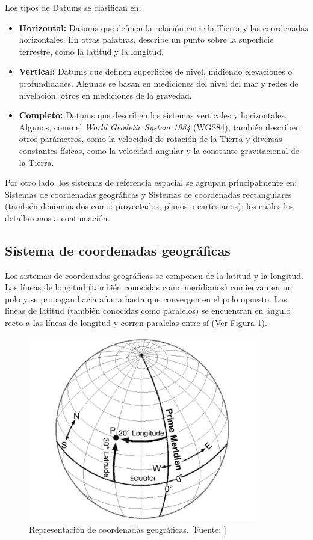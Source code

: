 Los tipos de Datums se clasifican en:
\begin{itemize}
    \item \textbf{Horizontal:} 
    Datums que definen la relación entre la Tierra y las coordenadas horizontales. En otras palabras, describe un punto sobre la superficie terrestre, como la latitud y la longitud.
    \item \textbf{Vertical:} 
    Datums que definen superficies de nivel, midiendo elevaciones o profundidades. Algunos se basan en mediciones del nivel del mar y redes de nivelación, otros en mediciones de la gravedad.
    \item \textbf{Completo:} 
    Datums que describen los sistemas verticales y horizontales. Algunos, como el \textit{World Geodetic System 1984} (WGS84), también describen otros parámetros, como la velocidad de rotación de la Tierra y diversas constantes físicas, como la velocidad angular y la constante gravitacional de la Tierra.
\end{itemize}

Por otro lado, los sistemas de referencia espacial se agrupan principalmente en: Sistemas de coordenadas geográficas y Sistemas de coordenadas rectangulares (también denominados como: proyectados, planos o cartesianos); los cuáles los detallaremos a continuación.

\subsection{Sistema de coordenadas geográficas}
Los sistemas de coordenadas geográficas se componen de la latitud y la longitud. Las líneas de longitud (también conocidas como meridianos) comienzan en un polo y se propagan hacia afuera hasta que convergen en el polo opuesto. Las líneas de latitud (también conocidas como paralelos) se encuentran en ángulo recto a las líneas de longitud y corren paralelas entre sí (Ver Figura \ref{fig:latitudLongitud}). 

\begin{figure}[H]
    \centering
    \includegraphics[width=10cm]{CoordenadasGeograficas.png}
    \caption{Representación de coordenadas geográficas. [Fuente: \citet{Fazal2008GISBasics}]}
    \label{fig:latitudLongitud}
\end{figure}

